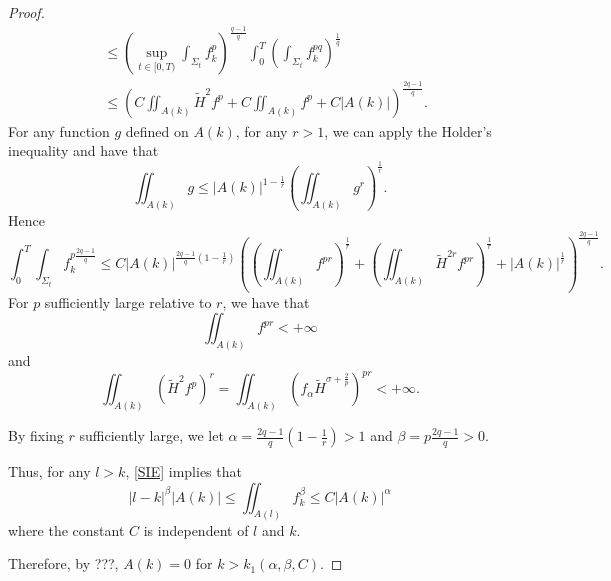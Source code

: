 \begin{proof}
\begin{equation}
\begin{split}
    & \leq \left( \sup _{t \in [0,T)} \int_{\Sigma_t} f_{k}^{p} \right) ^{\frac{q-1}{q}}  \int_{0}^{T} \left(\int_{\Sigma_t} f_{k}^{pq} \right) ^{\frac{1}{q}} \\
    & \leq \left( C \iint_{A(k)}^{} \tilde{H}^2 f^p +C \iint_{A(k)}^{}f^p + C \left| A(k) \right| \right) ^{\frac{2q-1}{q}}.
    \end{split}
    \end{equation}
    For any function $g$ defined on $A(k)$, for any $r>1$, we can apply the Holder's inequality and have that \[\iint_{A(k)}^{}g \leq \left| A(k) \right| ^{1-\frac{1}{r}}\left( \iint_{A(k)}^{} g^r \right) ^{\frac{1}{r}}.\]
    Hence
    \[\int_{0}^{T} \int_{\Sigma_t} f_{k}^{p \frac{2q-1}{q}} \leq C \left| A(k) \right| ^{\frac{2q-1}{q}\left( 1-\frac{1}{r} \right) } \left( \left( \iint_{A(k)}^{}f_{}^{pr}  \right) ^{\frac{1}{r}} + \left( \iint_{A(k)}^{}\tilde{H}^{2r} f_{}^{pr }  \right) ^{\frac{1}{r}}+\left| A(k) \right| ^{\frac{1}{r}} \right) ^{\frac{2q-1}{q}}. \]
    For $p$ sufficiently large relative to $r$, we have that 
    \[\iint_{A(k)}^{}f_{}^{pr } < + \infty \] and \[\iint_{A(k)}^{}\left( \tilde{H}^2f^p \right) ^r = \iint_{A(k)}^{}\left( f_{\alpha }\tilde{H}^{\sigma + \frac{2}{p}} \right) ^{pr}< + \infty .\]

    By fixing $r$ sufficiently large, we let $\alpha = \frac{2q-1}{q}\left( 1- \frac{1}{r} \right)>1 $ and $\beta = p \frac{2q-1}{q}>0 $.
    
    Thus, for any $l>k$, \autoref{SIE} implies that
    \[\left| l-k \right| ^{\beta }\left| A(k) \right| \leq \iint_{A(l)}^{}f_{k}^{\beta }  \leq C \left| A(k) \right| ^{\alpha }\]
    where the constant $C$ is independent of $l$ and $k$.

    Therefore, by ???, $A(k)=0$ for $k>k_1(\alpha , \beta , C)$. 
\end{proof}



\chapterend

